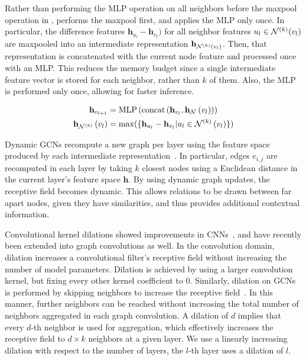 \documentclass[10pt,twocolumn,letterpaper]{article}
\begin{document}
Rather than performing the MLP operation on all neighbors before the maxpool operation in , \MRGCN performs the maxpool first, and applies the MLP only once.
In particular, the difference features $\mathbf{h}_{u_l}-\mathbf{h}_{v_l})$ for all neighbor features $u_l\in\mathcal{N}^{(k)}(v_l)$ are maxpooled into an intermediate representation $\mathbf{h}_{\mathcal{N}^{(k)}\left(v_l\right)}$. 
Then, that representation is concatenated with the current node feature and processed once with an MLP.
This reduces the memory budget since a single intermediate feature vector is stored for each neighbor, rather than $k$ of them.
Also, the MLP is performed only once, allowing for faster inference.





\begin{equation} 
\begin{aligned} 
    \mathbf{h}_{v_{l+1}}&
    =\text{MLP}\left(\text{concat}\left(\mathbf{h}_{v_l},\mathbf{h}_{\mathcal{N}}\left(v_l\right)\right)\right)\\
    \mathbf{h}_{\mathcal{N}^{(k)}}\left(v_l\right)&
    =\max(\{\mathbf{h}_{u_l}-\mathbf{h}_{v_l}|u_l\in\mathcal{N}^{(k)}\left(v_l)\}\right)
    \label{eq:MRGCN}
\end{aligned}
\end{equation}




Dynamic GCNs recompute a new graph per layer using the feature space produced by each intermediate representation~\cite{wang2019deep}.
In particular, edges $e_{i,j}$ are recomputed in each layer by taking $k$ closest nodes using a Euclidean distance in the current layer's feature space $\mathbf{h}$.
By using dynamic graph updates, the receptive field becomes dynamic.
This allows relations to be drawn between far apart nodes, given they have similarities, and thus provides additional contextual information.














Convolutional kernel dilations showed improvements in CNNs~\cite{yu2015multi}, and have recently been extended into graph convolutions as well.
In the convolution domain, dilation increases a convolutional filter's receptive field without increasing the number of model parameters.
Dilation is achieved by using a larger convolution kernel, but fixing every other kernel coefficient to $0$.
Similarly, dilation on GCNs is performed by skipping neighbors to increase the receptive field~\cite{Li2019deepgcn}.
In this manner, further neighbors can be reached without increasing the total number of neighbors aggregated in each graph convolution.
A dilation of $d$ implies that every $d$-th neighbor is used for aggregation, which effectively increases the receptive field to $d \times k$ neighbors at a given layer.
We use a linearly increasing dilation with respect to the number of layers, \ie the $l$-th layer uses a dilation of $l$.
\end{document}
